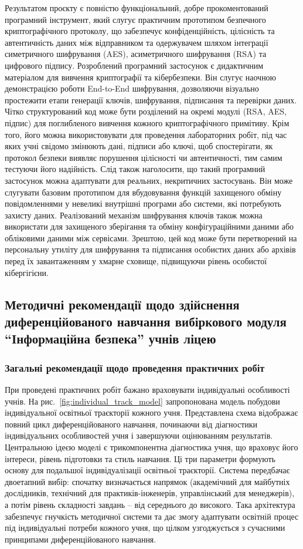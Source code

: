 Результатом проєкту є повністю функціональний, добре прокоментований програмний інструмент, який слугує практичним прототипом безпечного криптографічного протоколу, що забезпечує конфіденційність, цілісність та автентичність даних між відправником та одержувачем шляхом інтеграції симетричного шифрування (AES), асиметричного шифрування (RSA) та цифрового підпису. Розроблений програмний застосунок є дидактичним матеріалом для вивчення криптографії та кібербезпеки. Він слугує наочною демонстрацією роботи End-to-End шифрування, дозволяючи візуально простежити етапи генерації ключів, шифрування, підписання та перевірки даних. Чітко структурований код може бути розділений на окремі модулі (RSA, AES, підпис) для поглибленого вивчення кожного криптографічного примітиву. Крім того, його можна використовувати для проведення лабораторних робіт, під час яких учні свідомо змінюють дані, підписи або ключі, щоб спостерігати, як протокол безпеки виявляє порушення цілісності чи автентичності, тим самим тестуючи його надійність. Слід також наголосити, що такий програмний застосунок можна адаптувати для реальних, некритичних застосувань. Він може слугувати базовим прототипом для вбудовування функцій захищеного обміну повідомленнями у невеликі внутрішні програми або системи, які потребують захисту даних. Реалізований механізм шифрування ключів також можна використати для захищеного зберігання та обміну конфігураційними даними або обліковими даними між сервісами. Зрештою, цей код може бути перетворений на персональну утиліту для шифрування та підписання особистих даних або архівів перед їх завантаженням у хмарне сховище, підвищуючи рівень особистої кібергігієни.


\subsection{Методичні рекомендації щодо здійснення диференційованого навчання вибіркового модуля ``Інформаційна безпека'' учнів ліцею}


\subsubsection{Загальні рекомендації щодо проведення практичних робіт}

При проведені практичних робіт бажано враховувати індивідуальні особливості учнів. На  рис.~\ref{fig:individual_track_model} запропонована модель побудови індивідуальної освітньої траєкторії кожного учня. Представлена схема відображає повний цикл диференційованого навчання, починаючи від діагностики індивідуальних особливостей учня і завершуючи оцінюванням результатів. Центральною ідеєю моделі є трикомпонентна діагностика учня, що враховує його інтереси, рівень підготовки та стиль навчання. Ці три параметри формують основу для подальшої індивідуалізації освітньої траєкторії. Система передбачає двоетапний вибір: спочатку визначається напрямок (академічний для майбутніх дослідників, технічний для практиків-інженерів, управлінський для менеджерів), а потім рівень складності завдань -- від середнього до високого. Така архітектура забезпечує гнучкість методичної системи та дає змогу адаптувати освітній процес під індивідуальні потреби кожного учня, що цілком узгоджується з сучасними принципами диференційованого навчання. 


